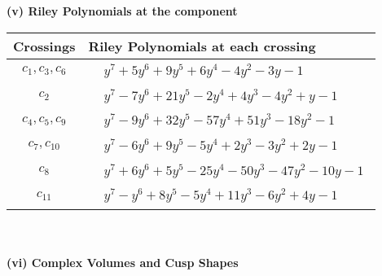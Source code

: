 \documentclass[1p]{elsarticle_modified}
\theoremstyle{definition}
\begin{document}
\newpage\renewcommand{\arraystretch}{1}
\flushleft \textbf{(v) Riley Polynomials at the component}\newline \\
\begin{tabular}{m{50pt}|m{274pt}}
Crossings & \hspace{64pt}Riley Polynomials at each crossing \\
\hline $$\begin{aligned}c_{1},c_{3},c_{6}\end{aligned}$$&$\begin{aligned}
&y^7+5 y^6+9 y^5+6 y^4-4 y^2-3 y-1
\end{aligned}$\\
\hline $$\begin{aligned}c_{2}\end{aligned}$$&$\begin{aligned}
&y^7-7 y^6+21 y^5-2 y^4+4 y^3-4 y^2+y-1
\end{aligned}$\\
\hline $$\begin{aligned}c_{4},c_{5},c_{9}\end{aligned}$$&$\begin{aligned}
&y^7-9 y^6+32 y^5-57 y^4+51 y^3-18 y^2-1
\end{aligned}$\\
\hline $$\begin{aligned}c_{7},c_{10}\end{aligned}$$&$\begin{aligned}
&y^7-6 y^6+9 y^5-5 y^4+2 y^3-3 y^2+2 y-1
\end{aligned}$\\
\hline $$\begin{aligned}c_{8}\end{aligned}$$&$\begin{aligned}
&y^7+6 y^6+5 y^5-25 y^4-50 y^3-47 y^2-10 y-1
\end{aligned}$\\
\hline $$\begin{aligned}c_{11}\end{aligned}$$&$\begin{aligned}
&y^7- y^6+8 y^5-5 y^4+11 y^3-6 y^2+4 y-1
\end{aligned}$\\
\hline
\end{tabular}\\~\\
\newpage\flushleft \textbf{(vi) Complex Volumes and Cusp Shapes}
\end{document}
